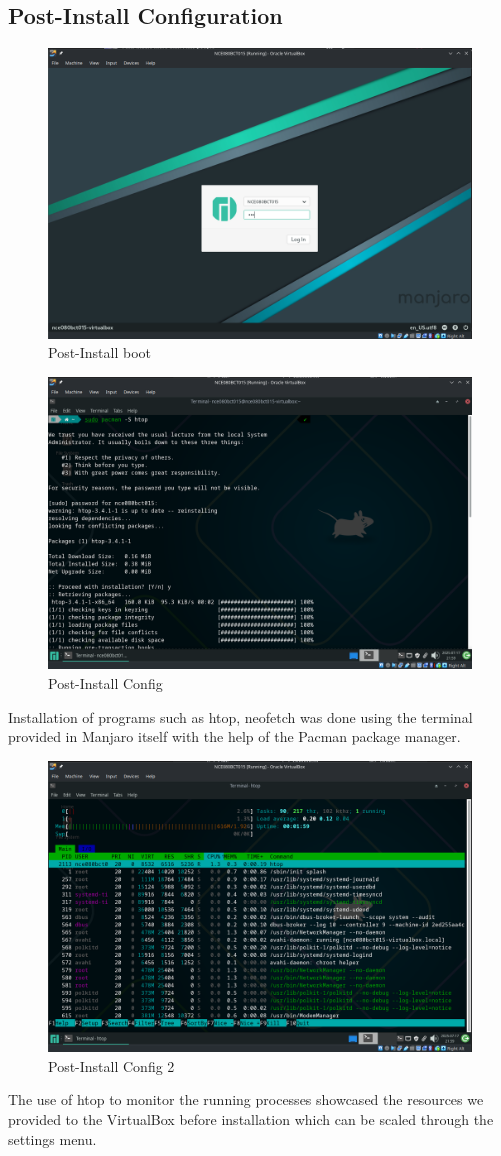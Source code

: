 \documentclass[a4paper,12pt]{report}
\begin{document}
\subsection{Post-Install Configuration}
\begin{figure}[h]
    \centering
    \includegraphics[width=0.7\linewidth]{post_install1.png}
    \caption{Post-Install boot}
    \label{fig19}
\end{figure}
\newpage
\begin{figure}[h]
    \centering
    \includegraphics[width=0.6\linewidth]{post_install_config.png}
    \caption{Post-Install Config}
    \label{fig20}
\end{figure}
Installation of programs such as htop, neofetch was done using the terminal provided in Manjaro itself with the help of the Pacman package manager. 
\newpage
\begin{figure}[h]
    \centering
    \includegraphics[width=0.6\linewidth]{post_install_config_2.png}
    \caption{Post-Install Config 2}
    \label{fig21}
\end{figure}
The use of htop to monitor the running processes showcased the resources we provided to the VirtualBox before installation which can be scaled through the settings menu.
\end{document}
